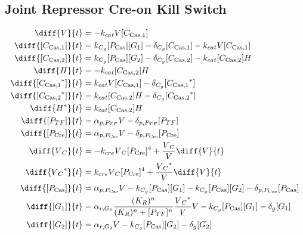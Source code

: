 \subsection{Joint Repressor Cre-on Kill Switch}
\label{s:Joint_Repressor_Cre_on_Kill_Switch}

\begin{align}
\diff{\vectorGen{}}{t} & = - \casCutRate{{}}\vectorGen{}\conc{\cplx{\cas}{1}}\\
\diff{\conc{\cplx{\cas}{1}}}{t} & =  \gRnaBind{}\conc{\proSp{\cas{}}}\conc{\gRna{1}} - \casCompDegradeRate{}\conc{\cplx{\cas}{1}} - \casCutRate{{}}\vectorGen{}\conc{\cplx{\cas}{1}}\\
\diff{\conc{\cplx{\cas}{2}}}{t} & =  \gRnaBind{}\conc{\proSp{\cas{}}}\conc{\gRna{2}} - \casCompDegradeRate{}\conc{\cplx{\cas}{2}} - \casCutRate{{}}\conc{\cplx{\cas}{2}}\hostGen{}\\
\diff{\hostGen{}}{t} & = - \casCutRate{{}}\conc{\cplx{\cas}{2}}\hostGen{}\\
\diff{\conc{\bound{\cplx{\cas}{1}}}}{t} & =  \casCutRate{{}}\vectorGen{}\conc{\cplx{\cas}{1}} - \casCompDegradeRate{}\conc{\bound{\cplx{\cas}{1}}}\\
\diff{\conc{\bound{\cplx{\cas}{2}}}}{t} & =  \casCutRate{{}}\conc{\cplx{\cas}{2}}\hostGen{} - \casCompDegradeRate{}\conc{\bound{\cplx{\cas}{2}}}\\
\diff{\edited{\hostGen{}}}{t} & =  \casCutRate{{}}\conc{\cplx{\cas}{2}}\hostGen{}\\
\diff{\conc{\proSp{TF}}}{t} & =  \txtlRate{\proSp{TF}}\vectorGen{} - \proDegradeRate{\proSp{TF}}\conc{\proSp{TF}}\\
\diff{\conc{\proSp{\cre{}}}}{t} & =  \txtlRate{\proSp{\cre{}}}\vectorGen{} - \proDegradeRate{\proSp{\cre{}}}\conc{\proSp{\cre{}}}\\
\diff{\vectorGen{}_C}{t} & = - \creCutRate{} \vectorGen{}_C \conc{\proSp{\cre{}}}^4 + \frac{\vectorGen{}_C}{\vectorGen{}} \diff{\vectorGen{}}{t}\\
\diff{\edited{\vectorGen{}_C}}{t} & =  \creCutRate{} \vectorGen{}_C \conc{\proSp{\cre{}}}^4 + \frac{\edited{\vectorGen{}_C}}{\vectorGen{}} \diff{\vectorGen{}}{t}\\
\diff{\conc{\proSp{\cas{}}}}{t} & =  \txtlRate{\proSp{\cas{}}}\vectorGen{} - \gRnaBind{}\conc{\proSp{\cas{}}}\conc{\gRna{1}} - \gRnaBind{}\conc{\proSp{\cas{}}}\conc{\gRna{2}} - \proDegradeRate{\proSp{\cas{}}}\conc{\proSp{\cas{}}}\\
\diff{\conc{\gRna{1}}}{t} & =  \txRate{\gRna{1}}\frac{(K_R)^n}{(K_R)^n + \conc{\proSp{TF}}^n}\frac{\edited{\vectorGen{}_C}}{\vectorGen{}}\vectorGen{} - \gRnaBind{}\conc{\proSp{\cas{}}}\conc{\gRna{1}} - \rnaDegradeRate{}\conc{\gRna{1}}\\
\diff{\conc{\gRna{2}}}{t} & =  \txRate{\gRna{2}}\vectorGen{} - \gRnaBind{}\conc{\proSp{\cas{}}}\conc{\gRna{2}} - \rnaDegradeRate{}\conc{\gRna{2}}
\end{align}

